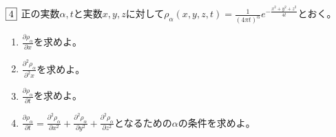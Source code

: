 \documentclass[dvipdfmx]{jsreport}
\newcounter{num}[section]
\begin{document}
\begin{tcolorbox} %
	$\fbox{4}$ 正の実数$\alpha, t$と実数$x, y, z$に対して$\rho_\alpha(x, y, z, t)= \frac{1}{(4\pi t)^\alpha}e^{-\frac{x^2+ y^2+ z^2}{4t}}$とおく。
\begin{enumerate}
	\item $\frac{\partial \rho_\alpha}{\partial x}$を求めよ。
	\item $\frac{\partial^2 \rho_\alpha}{\partial^2 x}$を求めよ。
	\item $\frac{\partial \rho_\alpha}{\partial t}$を求めよ。
	\item $\frac{\partial \rho_\alpha}{\partial t}= \frac{\partial^2 \rho_\alpha}{\partial x^2}+ \frac{\partial^2 \rho_\alpha}{\partial y^2}+ \frac{\partial^2 \rho_\alpha}{\partial z^2}$となるための$\alpha$の条件を求めよ。
\end{enumerate}
\end{tcolorbox}
\end{document}
